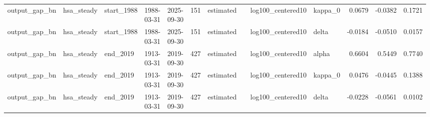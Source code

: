 \begin{tabular}{lllllrllllrrr}
output\_gap\_bn & hsa\_steady & start\_1988 & 1988-03-31 & 2025-09-30 & 151 & estimated &  & log100\_centered10 & kappa\_0 & 0.0679 & -0.0382 & 0.1721 \\
output\_gap\_bn & hsa\_steady & start\_1988 & 1988-03-31 & 2025-09-30 & 151 & estimated &  & log100\_centered10 & delta & -0.0184 & -0.0510 & 0.0157 \\
output\_gap\_bn & hsa\_steady & end\_2019 & 1913-03-31 & 2019-09-30 & 427 & estimated &  & log100\_centered10 & alpha & 0.6604 & 0.5449 & 0.7740 \\
output\_gap\_bn & hsa\_steady & end\_2019 & 1913-03-31 & 2019-09-30 & 427 & estimated &  & log100\_centered10 & kappa\_0 & 0.0476 & -0.0445 & 0.1388 \\
output\_gap\_bn & hsa\_steady & end\_2019 & 1913-03-31 & 2019-09-30 & 427 & estimated &  & log100\_centered10 & delta & -0.0228 & -0.0561 & 0.0102 \\
\bottomrule
\end{tabular}
